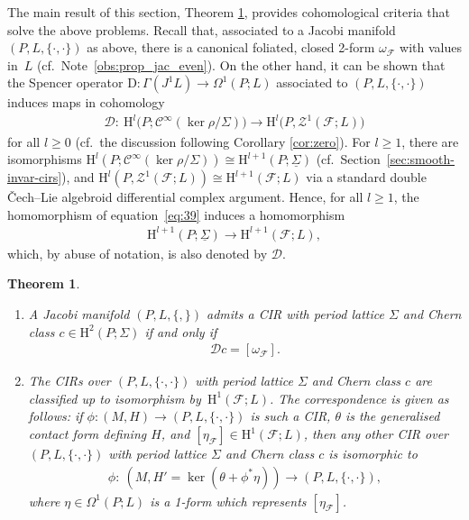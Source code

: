 \documentclass[10pt,a4paper]{amsart}
\numberwithin{equation}{section}
\newtheorem{Theorem}{Theorem}[section]
\newcommand{\JM}{(P,L,\{\cdot,\cdot\})} %
\newcommand{\CM}{(M,H)} %
\newcommand{\HH}{\mathrm{H}}
\begin{document}
The main result of this section, Theorem \ref{thm:main}, provides cohomological criteria that solve the above problems. Recall that, associated to a Jacobi manifold $\JM$ as above, there is a canonical foliated, closed 2-form $\omega_{\mathcal{F}}$ with values in~$L$ (cf.\ Note~\ref{obs:prop_jac_even}). On the other hand, it can be shown that the Spencer operator $\mathrm{D} \colon \Gamma (J^1L) \to \Omega^1\left(P;L\right)$ associated to $\JM$ induces maps in cohomology
\begin{gather} \label{eq:39}
 \mathcal{D} \colon \ \HH^l\big(P;\mathcal{C}^{\infty}(\ker \rho/\Sigma)\big)\to \HH^l\big(P,\mathcal{Z}^1(\mathcal{F};L)\big)
\end{gather}
for all $l \geq 0$ (cf.\ the discussion following Corollary \ref{cor:zero}). For $l \geq 1$, there are isomorphisms $\HH^l(P;\mathcal{C}^{\infty}(\ker \rho/\Sigma)) \cong \HH^{l+1}(P;\underline{\Sigma})$ (cf.\ Section~\ref{sec:smooth-invar-cirs}), and $\HH^l(P,\mathcal{Z}^1(\mathcal{F};L)) \cong
\HH^{l+1}(\mathcal{F};L)$ via a standard double \v{C}ech--Lie algebroid dif\/ferential complex argument. Hence, for all $l \geq 1$, the homomorphism of equation~\eqref{eq:39} induces a homomorphism
\begin{gather*}
 \HH^{l+1}(P;\underline{\Sigma})\to \HH^{l+1}(\mathcal{F};L),
\end{gather*}
which, by abuse of notation, is also denoted by $\mathcal{D}$.


\begin{Theorem}\label{thm:main}\quad
 \begin{enumerate}[label={\rm \arabic*.}, ref={\rm (\arabic*)}]\itemsep=0pt
 \item \label{item:19} A Jacobi manifold $(P,L,\{,\})$ admits a CIR with period lattice $\Sigma$ and Chern class $c \in \HH^2(P;\Sigma)$ if and only if
 \begin{gather*} %
 \mathcal{D}c = [\omega_{\mathcal{F}}].
 \end{gather*}
 \item \label{item:20} The CIRs over $\JM$ with period lattice $\Sigma$ and Chern class $c$ are classified up to isomorphism by~$\HH^1(\mathcal{F};L)$. The correspondence is given as follows: if $\phi \colon \CM \to \JM$ is such a CIR, $\theta$ is the generalised contact form defining $H$, and $[\eta_{\mathcal{F}}] \in \HH^1(\mathcal{F};L)$, then any other CIR over~$\JM$ with period lattice $\Sigma$ and Chern class $c$ is isomorphic to
 \begin{gather*}
 \phi \colon \ (M, H' = \ker (\theta + \phi^* \eta) ) \to \JM,
 \end{gather*}
 where $\eta \in \Omega^1(P;L)$ is a 1-form which represents $[\eta_{\mathcal{F}}]$.
\end{enumerate}
\end{Theorem}
\end{document}
